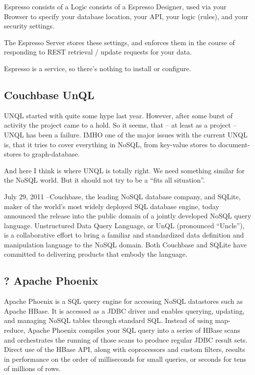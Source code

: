 Espresso consists of a Logic consists of a Espresso Designer, used via your Browser to specify your database location, your API, your logic (rules), and your security settings. 

The Espresso Server stores these settings, and enforces them in the course of responding to REST retrieval / update requests for your data. 

Espresso is a service, so there's nothing to install or configure. 

\subsection{Couchbase UnQL}
UNQL started with quite some hype last year. However, after some burst of activity the project came to a hold. So it seems, that – at least as a project – UNQL has been a failure. IMHO one of the major issues with the current UNQL is, that it tries to cover everything in NoSQL, from key-value stores to document-stores to graph-database.

And here I think is where UNQL is totally right. We need something similar for the NoSQL world. But it should not try to be a “fits all situation”. 

July 29, 2011 –Couchbase, the leading NoSQL database company, and SQLite, maker of the world’s most widely deployed SQL database engine, today announced the release into the public domain of a jointly developed NoSQL query language. Unstructured Data Query Language, or UnQL (pronounced “Uncle”), is a collaborative effort to bring a familiar and standardized data definition and manipulation language to the NoSQL domain. Both Couchbase and SQLite have committed to delivering products that embody the language.

\subsection{? Apache Phoenix}
Apache Phoenix is a SQL query engine for accessing NoSQL datastores such as Apache HBase. It is accessed as a JDBC driver and enables querying, updating, and managing NoSQL tables through standard SQL. Instead of using map-reduce, Apache Phoenix compiles your SQL query into a series of HBase scans and orchestrates the running of those scans to produce regular JDBC result sets. Direct use of the HBase API, along with coprocessors and custom filters, results in performance on the order of milliseconds for small queries, or seconds for tens of millions of rows.

